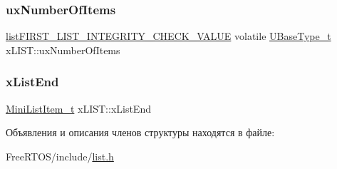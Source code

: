 \subsubsection{\texorpdfstring{uxNumberOfItems}{uxNumberOfItems}}
{\footnotesize\ttfamily \mbox{\hyperlink{list_8h_a3a52b5a4f70d3a07e37a5814a23ba880}{list\+F\+I\+R\+S\+T\+\_\+\+L\+I\+S\+T\+\_\+\+I\+N\+T\+E\+G\+R\+I\+T\+Y\+\_\+\+C\+H\+E\+C\+K\+\_\+\+V\+A\+L\+UE}} volatile \mbox{\hyperlink{portmacro_8h_a646f89d4298e4f5afd522202b11cb2e6}{U\+Base\+Type\+\_\+t}} x\+L\+I\+S\+T\+::ux\+Number\+Of\+Items}

\mbox{\label{structx_l_i_s_t_a49ad62fa153126e27e273811167b336a}} 
\subsubsection{\texorpdfstring{xListEnd}{xListEnd}}
{\footnotesize\ttfamily \mbox{\hyperlink{list_8h_a542a8d55e98bc407593979e61f83cd02}{Mini\+List\+Item\+\_\+t}} x\+L\+I\+S\+T\+::x\+List\+End}



Объявления и описания членов структуры находятся в файле\+:\begin{DoxyCompactItemize}
\item 
Free\+R\+T\+O\+S/include/\mbox{\hyperlink{list_8h}{list.\+h}}\end{DoxyCompactItemize}
